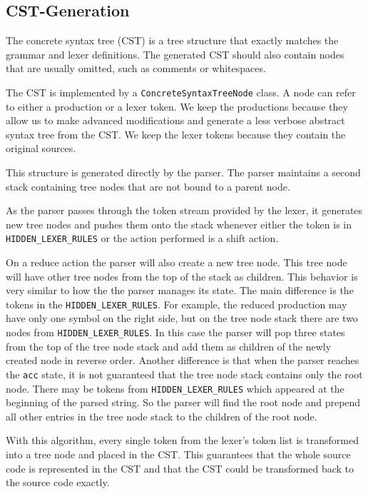 \subsection{CST-Generation}
The concrete syntax tree (CST) is a tree structure that exactly matches the grammar and lexer definitions. 
The generated CST should also contain nodes that are usually omitted, such as comments or whitespaces.

The CST is implemented by a \verb|ConcreteSyntaxTreeNode| class. 
A node can refer to either a production or a lexer token. 
We keep the productions because they allow us to make advanced modifications and generate a less verbose abstract syntax tree from the CST. 
We keep the lexer tokens because they contain the original sources.

This structure is generated directly by the parser. 
The parser maintains a second stack containing tree nodes that are not bound to a parent node.

As the parser passes through the token stream provided by the lexer, 
it generates new tree nodes and pushes them onto the stack whenever either the token is in \verb|HIDDEN_LEXER_RULES| or the action performed is a shift action. 

On a reduce action the parser will also create a new tree node. 
This tree node will have other tree nodes from the top of the stack as children. 
This behavior is very similar to how the the parser manages its state. 
The main difference is the tokens in the \verb|HIDDEN_LEXER_RULES|. 
For example, the reduced production may have only one symbol on the right side, but on the tree node stack there are two nodes from \verb|HIDDEN_LEXER_RULES|. 
In this case the parser will pop three states from the top of the tree node stack and add them as children of the newly created node in reverse order. 
Another difference is that when the parser reaches the \verb|acc| state, it is not guaranteed that the tree node stack contains only the root node. 
There may be tokens from \verb|HIDDEN_LEXER_RULES| which appeared at the beginning of the parsed string. 
So the parser will find the root node and prepend all other entries in the tree node stack to the children of the root node. 

With this algorithm, every single token from the lexer's token list is transformed into a tree node and placed in the CST. 
This guarantees that the whole source code is represented in the CST and that the CST could be transformed back to the source code exactly.

